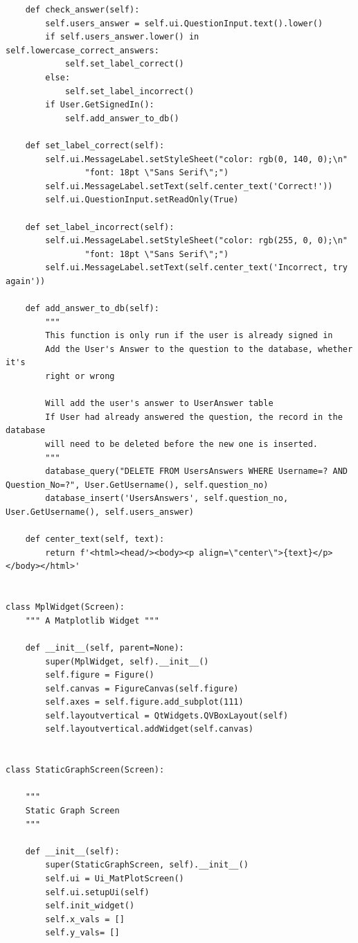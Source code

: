\documentclass{article}
\begin{document}
\begin{lstlisting}
    def check_answer(self):
        self.users_answer = self.ui.QuestionInput.text().lower()
        if self.users_answer.lower() in self.lowercase_correct_answers:
            self.set_label_correct()
        else:
            self.set_label_incorrect()
        if User.GetSignedIn():
            self.add_answer_to_db()

    def set_label_correct(self):
        self.ui.MessageLabel.setStyleSheet("color: rgb(0, 140, 0);\n"
                "font: 18pt \"Sans Serif\";")
        self.ui.MessageLabel.setText(self.center_text('Correct!'))
        self.ui.QuestionInput.setReadOnly(True)

    def set_label_incorrect(self):
        self.ui.MessageLabel.setStyleSheet("color: rgb(255, 0, 0);\n"
                "font: 18pt \"Sans Serif\";")
        self.ui.MessageLabel.setText(self.center_text('Incorrect, try again'))

    def add_answer_to_db(self):
        """
        This function is only run if the user is already signed in
        Add the User's Answer to the question to the database, whether it's
        right or wrong

        Will add the user's answer to UserAnswer table
        If User had already answered the question, the record in the database
        will need to be deleted before the new one is inserted.
        """
        database_query("DELETE FROM UsersAnswers WHERE Username=? AND Question_No=?", User.GetUsername(), self.question_no)
        database_insert('UsersAnswers', self.question_no, User.GetUsername(), self.users_answer)

    def center_text(self, text):
        return f'<html><head/><body><p align=\"center\">{text}</p></body></html>'


class MplWidget(Screen):
    """ A Matplotlib Widget """

    def __init__(self, parent=None):
        super(MplWidget, self).__init__()
        self.figure = Figure()
        self.canvas = FigureCanvas(self.figure)
        self.axes = self.figure.add_subplot(111)
        self.layoutvertical = QtWidgets.QVBoxLayout(self)
        self.layoutvertical.addWidget(self.canvas)


class StaticGraphScreen(Screen):

    """
    Static Graph Screen
    """

    def __init__(self):
        super(StaticGraphScreen, self).__init__()
        self.ui = Ui_MatPlotScreen()
        self.ui.setupUi(self)
        self.init_widget()
        self.x_vals = []
        self.y_vals= []


\end{lstlisting}
\end{document}
